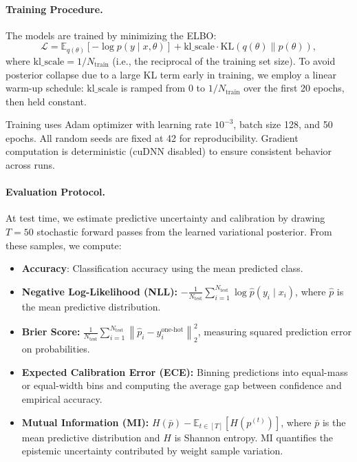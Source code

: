 \documentclass{article}
\theoremstyle{plain}
\theoremstyle{definition}
\theoremstyle{remark}
\begin{document}
\paragraph{Training Procedure.}
The models are trained by minimizing the ELBO:
\[
\mathcal{L} = \mathbb{E}_{q(\theta)}[-\log p(y \mid x, \theta)] + \text{kl\_scale} \cdot \text{KL}(q(\theta) \| p(\theta)),
\]
where $\text{kl\_scale} = 1/N_{\text{train}}$ (i.e., the reciprocal of the training set size). To avoid posterior collapse due to a large KL term early in training, we employ a linear warm-up schedule: $\text{kl\_scale}$ is ramped from 0 to $1/N_{\text{train}}$ over the first 20 epochs, then held constant.

Training uses Adam optimizer with learning rate $10^{-3}$, batch size 128, and 50 epochs. All random seeds are fixed at 42 for reproducibility. Gradient computation is deterministic (cuDNN disabled) to ensure consistent behavior across runs.

\paragraph{Evaluation Protocol.}
At test time, we estimate predictive uncertainty and calibration by drawing $T = 50$ stochastic forward passes from the learned variational posterior. From these samples, we compute:

\begin{itemize}
    \item \textbf{Accuracy}: Classification accuracy using the mean predicted class.
    \item \textbf{Negative Log-Likelihood (NLL):} $-\frac{1}{N_{\text{test}}}\sum_{i=1}^{N_{\text{test}}} \log \hat{p}(y_i \mid x_i)$, where $\hat{p}$ is the mean predictive distribution.
    \item \textbf{Brier Score:} $\frac{1}{N_{\text{test}}}\sum_{i=1}^{N_{\text{test}}} \left\| \hat{p}_i - y_i^{\text{one-hot}} \right\|_2^2$, measuring squared prediction error on probabilities.
    \item \textbf{Expected Calibration Error (ECE):} Binning predictions into equal-mass or equal-width bins and computing the average gap between confidence and empirical accuracy.
    \item \textbf{Mutual Information (MI):} $H(\bar{p}) - \mathbb{E}_{t \in [T]}[H(p^{(t)})]$, where $\bar{p}$ is the mean predictive distribution and $H$ is Shannon entropy. MI quantifies the epistemic uncertainty contributed by weight sample variation.
\end{itemize}
\end{document}
